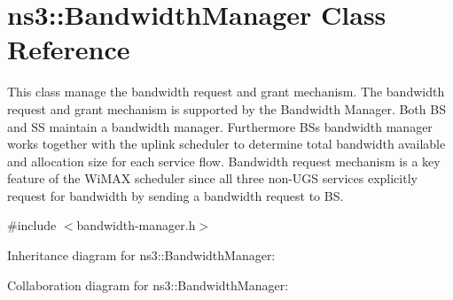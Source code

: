 \hypertarget{classns3_1_1BandwidthManager}{}\section{ns3\+:\+:Bandwidth\+Manager Class Reference}
\label{classns3_1_1BandwidthManager}


This class manage the bandwidth request and grant mechanism. The bandwidth request and grant mechanism is supported by the Bandwidth Manager. Both BS and SS maintain a bandwidth manager. Furthermore BS\textquotesingle{}s bandwidth manager works together with the uplink scheduler to determine total bandwidth available and allocation size for each service flow. Bandwidth request mechanism is a key feature of the Wi\+M\+AX scheduler since all three non-\/\+U\+GS services explicitly request for bandwidth by sending a bandwidth request to BS.  




{\ttfamily \#include $<$bandwidth-\/manager.\+h$>$}



Inheritance diagram for ns3\+:\+:Bandwidth\+Manager\+:


Collaboration diagram for ns3\+:\+:Bandwidth\+Manager\+:
